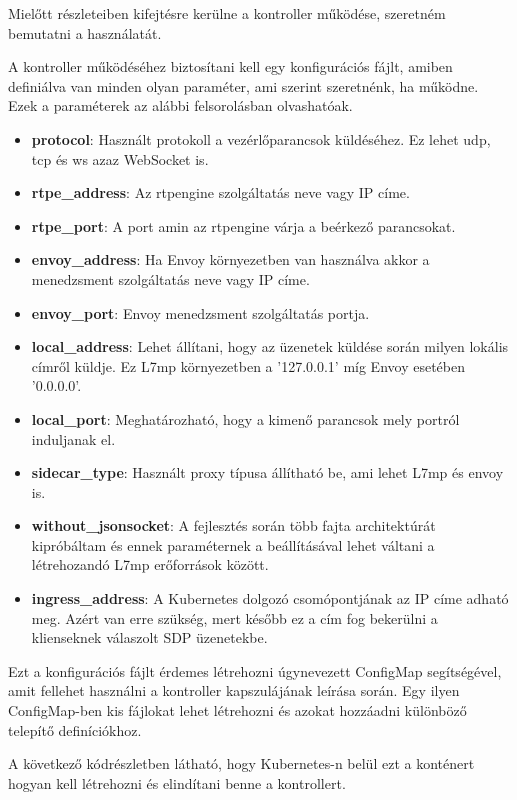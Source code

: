 Mielőtt részleteiben kifejtésre kerülne a kontroller működése, szeretném bemutatni a
használatát.

A kontroller működéséhez biztosítani kell egy konfigurációs fájlt, amiben definiálva
van minden olyan paraméter, ami szerint szeretnénk, ha működne. Ezek a paraméterek
az alábbi felsorolásban olvashatóak.

\begin{itemize}
	\item \textbf{protocol}: Használt protokoll a vezérlőparancsok küldéséhez. Ez lehet
	udp, tcp és ws azaz WebSocket is.
	\item \textbf{rtpe\_address}: Az rtpengine szolgáltatás neve vagy IP címe. 
	\item \textbf{rtpe\_port}: A port amin az rtpengine várja a beérkező parancsokat. 
	\item \textbf{envoy\_address}: Ha Envoy környezetben van használva akkor a menedzsment
	szolgáltatás neve vagy IP címe. 
	\item \textbf{envoy\_port}: Envoy menedzsment szolgáltatás portja. 
	\item \textbf{local\_address}: Lehet állítani, hogy az üzenetek küldése során milyen
	lokális címről küldje. Ez L7mp környezetben a '127.0.0.1' míg Envoy esetében '0.0.0.0'.
	\item \textbf{local\_port}: Meghatározható, hogy a kimenő parancsok mely portról
	induljanak el. 
	\item \textbf{sidecar\_type}: Használt proxy típusa állítható be, ami lehet L7mp és envoy is.
	\item \textbf{without\_jsonsocket}: A fejlesztés során több fajta architektúrát kipróbáltam
	és ennek paraméternek a beállításával lehet váltani a létrehozandó L7mp erőforrások között. 
	\item \textbf{ingress\_address}: A Kubernetes dolgozó csomópontjának az IP címe adható meg.
	Azért van erre szükség, mert később ez a cím fog bekerülni a klienseknek válaszolt SDP
	üzenetekbe. 
\end{itemize}

Ezt a konfigurációs fájlt érdemes létrehozni úgynevezett ConfigMap segítségével, amit fellehet
használni a kontroller kapszulájának leírása során. Egy ilyen ConfigMap-ben kis fájlokat 
lehet létrehozni és azokat hozzáadni különböző telepítő definíciókhoz. 

A következő kódrészletben látható, hogy Kubernetes-n belül ezt a konténert hogyan kell 
létrehozni és elindítani benne a kontrollert. 

